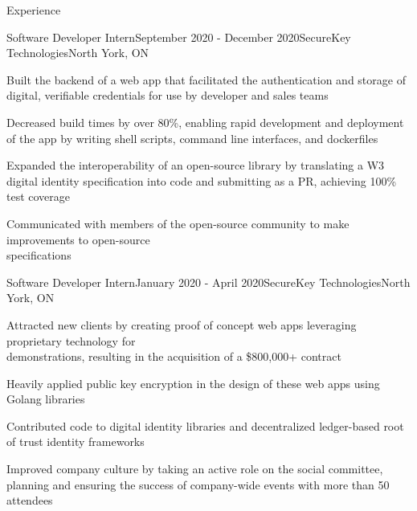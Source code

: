 \documentclass{resume} %
\begin{document}
	\begin{rSection}{Experience}
	
	    \begin{rSubsection}{Software Developer Intern}{September 2020 - December 2020}{SecureKey Technologies}{North York, ON}{}
			\item Built the backend of a web app that facilitated the authentication and storage of digital, verifiable credentials for use by developer and sales teams
			\item Decreased build times by over 80\%, enabling rapid development and deployment of the app by writing shell scripts, command line interfaces, and dockerfiles
			\item Expanded the interoperability of an open-source library by translating a W3 digital identity specification into code and submitting as a PR, achieving 100\% test coverage
			\item Communicated with members of the open-source community to make improvements to open-source \\ specifications
		\end{rSubsection}
		
		\begin{rSubsection}{Software Developer Intern}{January 2020 - April 2020}{SecureKey Technologies}{North York, ON}{}
		    \item Attracted new clients by creating proof of concept web apps leveraging proprietary technology for \\ demonstrations, resulting in the acquisition of a \$800,000+ contract
		    \item Heavily applied public key encryption in the design of these web apps using Golang libraries
		    \item Contributed code to digital identity libraries and decentralized ledger-based root of trust identity frameworks
		    \item Improved company culture by taking an active role on the social committee, planning and ensuring the success of company-wide events with more than 50 attendees
		\end{rSubsection}

	\end{rSection}
	
\end{document}
